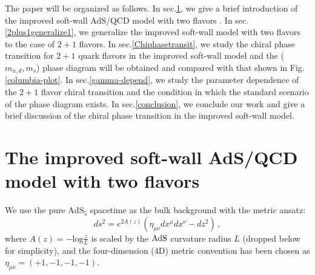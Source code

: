 \documentclass[11pt,a4paper,psfrag]{article}
\begin{document}
The paper will be organized as follows. In sec.\ref{2flavorcase1}, we give a brief introduction of the improved soft-wall AdS/QCD model with two flavors \cite{Fang:2016nfj}. In sec.\ref{2plus1generalize1}, we generalize the improved soft-wall model with two flavors to the case of $2+1$ flavors. In sec.\ref{Chiphasetransit}, we study the chiral phase transition for $2+1$ quark flavors in the improved soft-wall model and the ($m_{u,d}, m_s$) phase diagram will be obtained and compared with that shown in Fig.\ref{columbia-plot}. In sec.\ref{gamma-depend}, we study the parameter dependence of the $2+1$ flavor chiral transition and the condition in which the standard scenario of the phase diagram exists. In sec.\ref{conclusion}, we conclude our work and give a brief discussion of the chiral phase transition in the improved soft-wall model.



\section{The improved soft-wall AdS/QCD model with two flavors}\label{2flavorcase1}

We use the pure $\mathrm{AdS}_5$ spacetime as the bulk background with the metric ansatz:
\begin{equation}\label{metric}
ds^2=e^{2A(z)}\left(\eta_{\mu\nu}dx^{\mu}dx^{\nu}-dz^2\right) \,,
\end{equation}
where $A(z)=-\mathrm{log}\frac{z}{L}$ is scaled by the $\rm{AdS}$ curvature radius $L$ (dropped below for simplicity), and the four-dimension (4D) metric convention has been chosen as $\eta_{\mu\nu}=(+1,-1,-1,-1)$.
\end{document}
